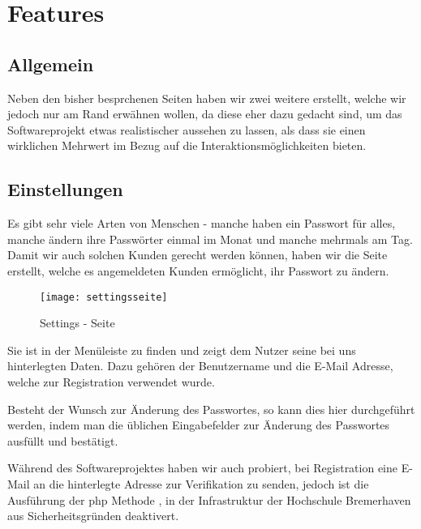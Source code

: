 \chapter{Features}
\label{sec:MyGain-Features}

\section{Allgemein}
Neben den bisher besprchenen Seiten haben wir zwei weitere erstellt, welche wir jedoch nur am Rand erwähnen wollen, da diese eher dazu gedacht sind, um das Softwareprojekt etwas realistischer aussehen zu lassen, als dass sie einen wirklichen Mehrwert im Bezug auf die Interaktionsmöglichkeiten bieten.\\

\section{Einstellungen}
Es gibt sehr viele Arten von Menschen - manche haben ein Passwort für alles, manche ändern ihre Passwörter einmal im Monat und manche mehrmals am Tag. Damit wir auch solchen Kunden gerecht werden können, haben wir die Seite  erstellt, welche es angemeldeten Kunden ermöglicht, ihr Passwort zu ändern. \\

\begin{figure}[H]
    \begin{center}
        \texttt{[image: settingsseite]}
        \caption{Settings - Seite}
        \label{fig:settingssite}
    \end{center}
    \centering
\end{figure}

Sie ist in der Menüleiste zu finden und zeigt dem Nutzer seine bei uns hinterlegten Daten. Dazu gehören der Benutzername und die E-Mail Adresse, welche zur Registration verwendet wurde.

Besteht der Wunsch zur Änderung des Passwortes, so kann dies hier durchgeführt werden, indem man die üblichen Eingabefelder zur Änderung des Passwortes ausfüllt und bestätigt.

Während des Softwareprojektes haben wir auch probiert, bei Registration eine E-Mail an die hinterlegte Adresse zur Verifikation zu senden, jedoch ist die Ausführung der php Methode , in der Infrastruktur der Hochschule Bremerhaven aus Sicherheitsgründen deaktivert.\\

